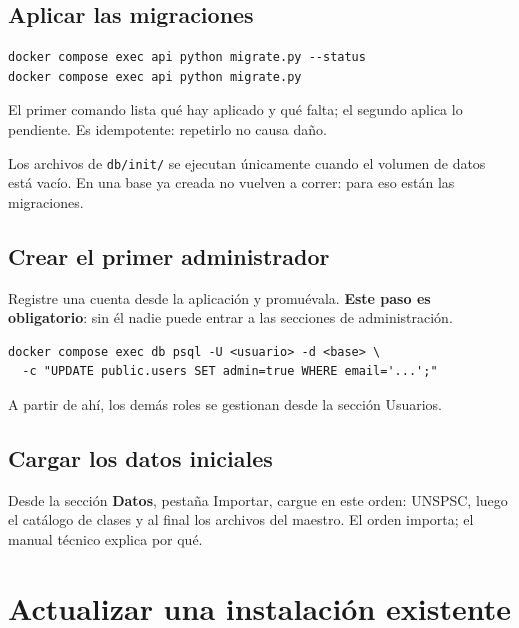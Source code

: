 \subsection{Aplicar las migraciones}

\begin{verbatim}
docker compose exec api python migrate.py --status
docker compose exec api python migrate.py
\end{verbatim}

El primer comando lista qué hay aplicado y qué falta; el segundo aplica lo
pendiente. Es idempotente: repetirlo no causa daño.

\begin{nota}
Los archivos de \texttt{db/init/} se ejecutan únicamente cuando el volumen de
datos está vacío. En una base ya creada no vuelven a correr: para eso están las
migraciones.
\end{nota}

\subsection{Crear el primer administrador}

Registre una cuenta desde la aplicación y promuévala. \textbf{Este paso es
obligatorio}: sin él nadie puede entrar a las secciones de administración.

\begin{verbatim}
docker compose exec db psql -U <usuario> -d <base> \
  -c "UPDATE public.users SET admin=true WHERE email='...';"
\end{verbatim}

A partir de ahí, los demás roles se gestionan desde la sección Usuarios.

\subsection{Cargar los datos iniciales}

Desde la sección \textbf{Datos}, pestaña Importar, cargue en este orden: UNSPSC,
luego el catálogo de clases y al final los archivos del maestro. El orden
importa; el manual técnico explica por qué.

\newpage
\section{Actualizar una instalación existente}

